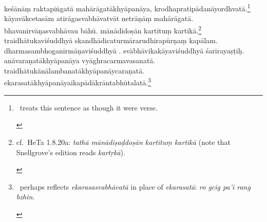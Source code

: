\documentclass[naipra.tex]{subfiles}
\begin{document}
\begin{sanskrit}
\medskip\pstart
keśānāṃ raktapiṅgatā mahārāgatākhyāpanāya, krodhapratipādanāyordhvatā.\footnote{\begin{english}
	\TIB\ treats this sentence as though it were verse.
\end{english}}
kāyavākcetasām atirāgasvabhāvatvāt  netrāṇāṃ mahārāgatā.
bhavanirvāṇasvabhāvau bāhū.
mānādidoṣān kartituṃ kartikā.\footnote{\begin{english}
	cf.\ HeTa 1.8.20a: \emph{tathā mānādiṣaḍdoṣān kartituṃ kartikā} (note that Snellgrove's edition reads \emph{kartṛkā}).
\end{english}}
traidhātukaviśuddhyā skandhādicaturmārarudhirapūrṇaṃ   kapālam.
dharmasambhoganirmāṇaviśuddhyā . %
svābhāvikakāyaviśuddhyā śarīrayaṣṭiḥ.
anāvaraṇatākhyāpanāya vyāghracarmavasanatā.
traidhātukānālambanatākhyāpanāy\crux {}\crux caraṇatā.
ekarasatākhyāpanāyaikapādākrāntabhūtalatā.\footnote{\begin{english}
	\TIB\ perhaps reflects \emph{ekarasasvabhāvatā} in place of \emph{ekarasatā}: \emph{ro gcig pa'i rang bzhin}.
\end{english}}
\pend




\end{sanskrit}
\end{document}
